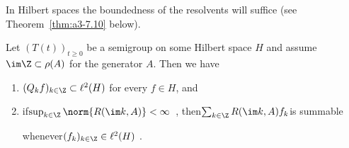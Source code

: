 In Hilbert spaces the boundedness of the resolvents will suffice (see Theorem~\ref{thm:a3-7.10} below).
\begin{lemma}\label{lem:a3-7.9}
Let $(T(t))_{t\geq 0}$ be a semigroup on some Hilbert space $H$ and assume $\im\Z \subset \rho(A)$ for the generator $A$.
Then we have
\begin{enumerate}[\upshape (i)]
\item 
$(Q_{k}f)_{k\in\Z} \subset \ell^{2}(H)$ for every $f \in H$, and

\item 
if\quad $\sup_{k\in\Z}\norm{R(\im k,A)} < \infty$~, then\quad $\sum_{k\in\Z} R(\im k,A)f_{k}$\quad is summable 

whenever\quad $(f_{k})_{k\in\Z} \in \ell^{2}(H)$ .
\end{enumerate}
\end{lemma}

